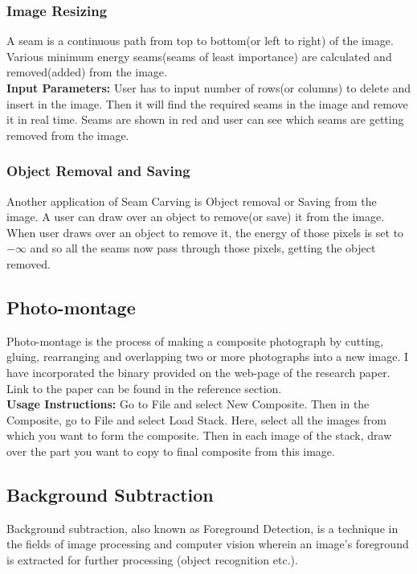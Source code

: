 \documentclass[12pt]{article}
\begin{document}
\subsubsection{Image Resizing}
 A seam is a continuous path from top to bottom(or left to right) of the image. Various minimum energy seams(seams of least importance) are calculated and removed(added) from the image. \\

\textbf{Input Parameters:} User has to input number of rows(or columns) to delete and insert in the image. Then it will find the required seams in the image and remove it in real time. Seams are shown in red and user can see which seams are getting removed from the image.\\


\subsubsection{Object Removal and Saving}
Another application of Seam Carving is Object removal or Saving from the image. A user can draw over an object to remove(or save) it from the image. When user draws over an object to remove it, the energy of those pixels is set to $-\infty$ and so all the seams now pass through those pixels, getting the object removed.\\

\subsection{Photo-montage}
Photo-montage is the process of making a composite photograph by cutting, gluing, rearranging and overlapping two or more photographs into a new image. I have incorporated the binary provided on the web-page of the research paper. Link to the paper can be found in the reference section.\\

\textbf{Usage Instructions:} Go to File and select New Composite. Then in the Composite, go to File and select Load Stack. Here, select all the images from which you want to form the composite. Then in each image of the stack, draw over the part you want to copy to final composite from this image.

\subsection{Background Subtraction}

Background subtraction, also known as Foreground Detection, is a technique in the fields of image processing and computer vision wherein an image's foreground is extracted for further processing (object recognition etc.).\\
\end{document}
